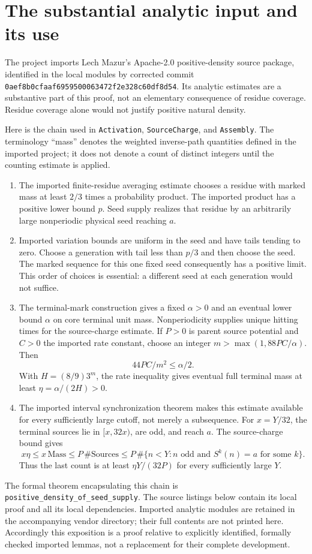 \documentclass[11pt]{article}
\begin{document}
\section{The substantial analytic input and its use}
The project imports Lech Mazur's Apache-2.0 positive-density source package,
identified in the local modules by corrected commit
\texttt{0aef8b0cfaaf6959500063472f2e328c60df8d54}.
Its analytic estimates are a substantive part of this proof, not an
elementary consequence of residue coverage. Residue coverage alone would
not justify positive natural density.

Here is the chain used in \texttt{Activation}, \texttt{SourceCharge}, and
\texttt{Assembly}. The terminology ``mass'' denotes the weighted inverse-path
quantities defined in the imported project; it does not denote a count of
distinct integers until the counting estimate is applied.

\begin{enumerate}
\item The imported finite-residue averaging estimate chooses a residue with
marked mass at least $2/3$ times a probability product. The imported product
has a positive lower bound $p$. Seed supply realizes that residue by an
arbitrarily large nonperiodic physical seed reaching $a$.
\item Imported variation bounds are uniform in the seed and have tails
tending to zero. Choose a generation with tail less than $p/3$ and then
choose the seed. The marked sequence for this one fixed seed consequently
has a positive limit. This order of choices is essential: a different seed
at each generation would not suffice.
\item The terminal-mark construction gives a fixed $\alpha>0$ and an eventual
lower bound $\alpha$ on core terminal unit mass. Nonperiodicity supplies
unique hitting times for the source-charge estimate. If $P>0$ is parent
source potential and $C>0$ the imported rate constant, choose an integer
$m>\max(1,88PC/\alpha)$. Then
\[
 44PC/m^2\le\alpha/2.
\]
With $H=(8/9)3^m$, the rate inequality gives eventual full terminal mass
at least $\eta=\alpha/(2H)>0$.
\item The imported interval synchronization theorem makes this estimate
available for every sufficiently large cutoff, not merely a subsequence.
For $x=Y/32$, the terminal sources lie in $[x,32x)$, are odd, and reach $a$.
The source-charge bound gives
\[
 x\eta\le x\,\mathrm{Mass}\le P\,\#\mathrm{Sources}
 \le P\,\#\{n<Y:n\text{ odd and }S^k(n)=a\text{ for some }k\}.
\]
Thus the last count is at least $\eta Y/(32P)$ for every sufficiently
large $Y$.
\end{enumerate}
The formal theorem encapsulating this chain is
\texttt{positive\_density\_of\_seed\_supply}. The source listings below
contain its local proof and all its local dependencies. Imported analytic
modules are retained in the accompanying vendor directory; their full
contents are not printed here. Accordingly this exposition is a proof
relative to explicitly identified, formally checked imported lemmas, not
a replacement for their complete development.
\end{document}
